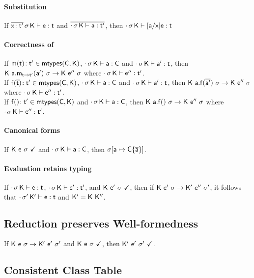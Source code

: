\documentclass[a4paper,USenglish]{tex/lipics-v2016}
\begin{document}
\paragraph{Substitution}

If $\EnvType{\b{\HT\x\tp}}\s\K\e\t$ and $\b{\EnvType\cdot\s\K\a\tp}$, then $\EnvType\cdot\s\K{[\a/\x]\e}\t$

\paragraph{Correctness of \classoff{\C}{\K}}

If $\Mtype\m{\t}\tp \in \classoff{\C}{\K}$, $\cdot\,\sigma\,{\sf{K}}\vdash {\sf{a}} : {\sf{C}}$ and 
$\EnvType\cdot\s\K\ap\t$, then $\Reduce \K{\KCall\a\m{\ap}{\t}{\tp}}\s \K\epp\s$ where $\EnvType\cdot\s\K\epp\tp$. \\
If $\Mtype\f{\b\t}\tp \in \classoff{\C}{\K}$, $\cdot\,\sigma\,{\sf{K}}\vdash {\sf{a}} : {\sf{C}}$ and 
$\EnvType\cdot\s\K\ap\t$, then ${{\sf{K}}}~{{\sf{a}}.{\sf{f}}(\overline{{\sf{a}}'})}~{\sigma} \rightarrow {\ensuremath{{\sf{K}}}}~{{{{\sf{e''}}}}}~{\sigma}$ where $\EnvType\cdot\s\K\epp\tp$. \\
If $\Mtype\f{}\tp \in \classoff{\C}{\K}$ and $\cdot\,\sigma\,{\sf{K}}\vdash {\sf{a}} : {\sf{C}}$, 
then ${{\sf{K}}}~{{\sf{a}}.{\sf{f}}()}~{\sigma} \rightarrow {\ensuremath{{\sf{K}}}}~{{{{\sf{e''}}}}}~{\sigma}$ where $\EnvType\cdot\s\K\epp\tp$.

\paragraph{Canonical forms}

If ${\sf{K}}~{\sf{e}}~\sigma~\checkmark$ and $\cdot\,\sigma\,{\sf{K}}\vdash {\sf{a}} : {\sf{C}}$, then $\sigma[{\sf{a}}\mapsto{ \ensuremath{ {\sf{C}}\{\overline{{\sf{a}}}\}}}]$.

\paragraph{Evaluation retains typing} \label{lem:ert}

If $\EnvType\cdot\s\K\e\t$, $\EnvType\cdot\s\K\ep\tp$, and ${\sf{K}}~{{{\sf{e'}}}}~\sigma~\checkmark$, then if ${{\sf{K}}}~{{{{\sf{e'}}}}}~{\sigma} \rightarrow {{\ensuremath{{\sf{K'}}}}}~{{{{\sf{e''}}}}}~{{{\sigma'}}}$, it follows that $\EnvType\cdot\sp\Kp\e\t$ and ${{\sf{K'}}} = {\sf{K}}~{{\sf{K''}}}$.

\subsection{Reduction preserves Well-formedness}

If ${{\sf{K}}}~{{\sf{e}}}~{\sigma} \rightarrow {{\ensuremath{{\sf{K'}}}}}~{{{{\sf{e'}}}}}~{{{\sigma'}}}$ and ${\sf{K}}~{\sf{e}}~\sigma~\checkmark$, then ${{\sf{K'}}}~{{{\sf{e'}}}}~{{\sigma'}}~\checkmark$. 

\subsection{Consistent Class Table}
\end{document}
